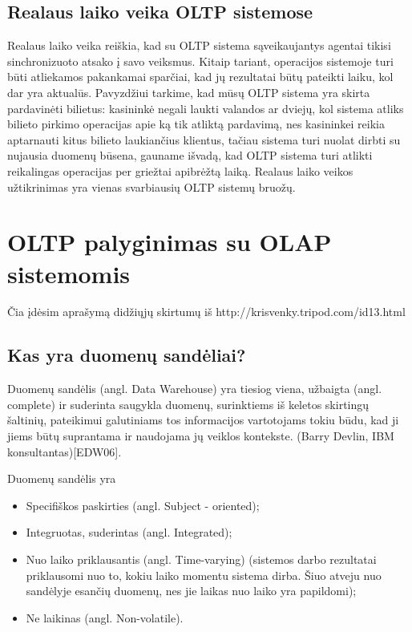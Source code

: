 \documentclass[12pt,a4paper,titlepage]{article}
\begin{document}
\subsection{Realaus laiko veika OLTP sistemose}
Realaus laiko veika reiškia, kad su OLTP sistema sąveikaujantys agentai tikisi sinchronizuoto atsako į savo veiksmus. Kitaip tariant, operacijos sistemoje turi būti atliekamos pakankamai sparčiai, kad jų rezultatai būtų pateikti laiku, kol dar yra aktualūs. Pavyzdžiui tarkime, kad mūsų OLTP sistema yra skirta pardavinėti bilietus: kasininkė negali laukti valandos ar dviejų, kol sistema atliks bilieto pirkimo operacijas apie ką tik atliktą pardavimą, nes kasininkei reikia aptarnauti kitus bilieto laukiančius klientus, tačiau sistema turi nuolat dirbti su nujausia duomenų būsena, gauname išvadą, kad OLTP sistema turi atlikti reikalingas operacijas per griežtai apibrėžtą laiką. Realaus laiko veikos užtikrinimas yra vienas svarbiausių OLTP sistemų bruožų.

\section{OLTP palyginimas su OLAP sistemomis}

Čia įdėsim aprašymą didžiųjų skirtumų iš http://krisvenky.tripod.com/id13.html

\subsection{Kas yra duomenų sandėliai?}

Duomenų sandėlis (angl. Data Warehouse) yra tiesiog viena, užbaigta (angl. complete) ir suderinta saugykla duomenų, surinktiems iš keletos skirtingų šaltinių, pateikimui galutiniams tos informacijos vartotojams tokiu būdu, kad ji jiems būtų suprantama ir naudojama jų veiklos kontekste. (Barry Devlin, IBM konsultantas)[EDW06].

Duomenų sandėlis yra
\begin{itemize}
  \item Specifiškos paskirties (angl. Subject - oriented);
  \item Integruotas, suderintas (angl. Integrated);
  \item Nuo laiko priklausantis (angl. Time-varying) (sistemos darbo rezultatai priklausomi nuo to, kokiu laiko momentu sistema dirba. Šiuo atveju nuo sandėlyje esančių duomenų, nes jie laikas nuo laiko yra papildomi);
  \item Ne laikinas (angl. Non-volatile).
\end{itemize}
\end{document}
